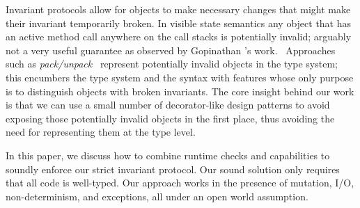 Invariant protocols allow for objects to make necessary changes that might make their invariant temporarily broken.
In visible state semantics any object that has an active method call anywhere on the call stacks is potentially invalid;
arguably not a very useful guarantee as observed by
Gopinathan \etal's work.~\cite{Gopinathan:2008:RMO:1483018.1483028}
Approaches such as \textit{pack/unpack}~\cite{DBLP:journals/jot/BarnettDFLS04} 
represent potentially invalid objects in the type system; this
encumbers the type system and the syntax with features whose only purpose is to distinguish objects with broken invariants. %
The core insight behind our work 
is that we can use a small number of decorator-like design patterns to avoid exposing those potentially invalid objects 
in the first place, thus avoiding the need for representing them at the type level.



In this paper, we discuss how to combine runtime checks and capabilities
to soundly enforce our strict invariant protocol.
Our sound solution only requires 
that all code is well-typed. Our approach works in the presence of mutation, I/O, non-determinism, and exceptions, all under an open world assumption.

